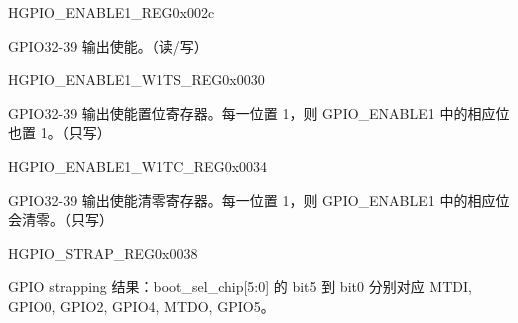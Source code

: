 \begin{register}{H}{GPIO\_ENABLE1\_REG}{0x002c}\label{regdesc:GPIOENABLE1REG}
%
%
\regnewline%
\begin{regdesc}\begin{reglist}
\item [GPIO\_ENABLE\_DATA]GPIO32-39 输出使能。（读/写） 
\end{reglist}\end{regdesc}
\end{register}


\begin{register}{H}{GPIO\_ENABLE1\_W1TS\_REG}{0x0030}\label{regdesc:GPIOENABLE1W1TSREG}
%
%
\regnewline%
\begin{regdesc}\begin{reglist}
\item [GPIO\_ENABLE\_DATA]GPIO32-39 输出使能置位寄存器。每一位置 1，则 GPIO\_ENABLE1 中的相应位也置 1。（只写）
\end{reglist}\end{regdesc}
\end{register}


\begin{register}{H}{GPIO\_ENABLE1\_W1TC\_REG}{0x0034}\label{regdesc:GPIOENABLE1W1TCREG}
%
%
\regnewline%
\begin{regdesc}\begin{reglist}
\item [GPIO\_ENABLE\_DATA]GPIO32-39 输出使能清零寄存器。每一位置 1，则 GPIO\_ENABLE1 中的相应位会清零。（只写）
\end{reglist}\end{regdesc}
\end{register}


\begin{register}{H}{GPIO\_STRAP\_REG}{0x0038}\label{regdesc:GPIOSTRAPREG}
%
%
\regnewline%
\begin{regdesc}\begin{reglist}
\item [GPIO\_STRAPPING]GPIO strapping 结果：boot\_sel\_chip[5:0] 的 bit5 到 bit0 分别对应 MTDI, GPIO0, GPIO2, GPIO4, MTDO, GPIO5。
\end{reglist}\end{regdesc}
\end{register}


